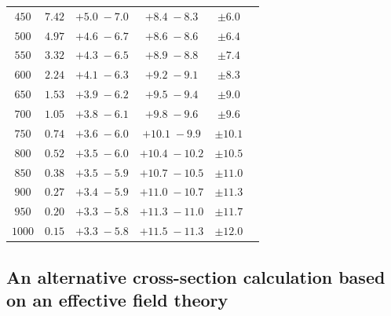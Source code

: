 \begin{table}[!h]
\begin{center}
\begin{tabular}{cccccc}
$450$ & $7.42$  & ${ +5.0 \; -7.0 }$ & ${ +8.4\; -8.3}$ & ${\pm 6.0 } $  \\  
$500$ & $4.97$  & ${ +4.6 \; -6.7 }$ & ${ +8.6\; -8.6}$ & ${\pm 6.4 } $ \\  
$550$ & $3.32$  & ${ +4.3 \; -6.5 }$ & ${ +8.9\; -8.8}$ & ${\pm 7.4 } $ \\  
$600$ & $2.24$  & ${ +4.1 \; -6.3 }$ & ${ +9.2\; -9.1}$ & ${\pm 8.3 } $  \\  
$650$ & $1.53$  & ${ +3.9 \; -6.2 }$ & ${ +9.5\; -9.4}$ & ${\pm 9.0 } $  \\  
$700$ & $1.05$  & ${ +3.8 \; -6.1 }$ & ${ +9.8\; -9.6}$ & ${\pm 9.6 } $  \\  
$750$ & $0.74$  & ${ +3.6 \; -6.0 }$ & ${+10.1\; -9.9}$ & ${\pm 10.1 } $  \\  
$800$ & $0.52$  & ${ +3.5 \; -6.0 }$ & ${+10.4\;-10.2}$ & ${\pm 10.5 } $ \\  
$850$ & $0.38$  & ${ +3.5 \; -5.9 }$ & ${+10.7\;-10.5}$ & ${\pm 11.0 } $  \\  
$900$ & $0.27$  & ${ +3.4 \; -5.9 }$ & ${+11.0\;-10.7}$ & ${\pm 11.3 } $  \\  
$950$ & $0.20$  & ${ +3.3 \; -5.8 }$ & ${+11.3\;-11.0}$ & ${\pm 11.7 } $ \\  
$1000$ & $0.15$ & ${ +3.3 \; -5.8 }$ & ${+11.5\;-11.3}$ & ${\pm 12.0 } $  \\ \hline
\end{tabular} 
\end{center} 
\end{table}


\subsection{An alternative cross-section calculation based on an
effective field theory}

